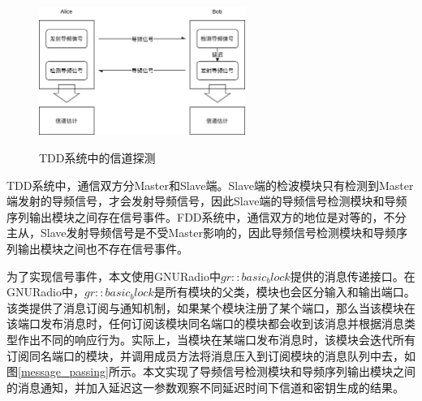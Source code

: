 
\begin{figure}[htbp]
    \centering
    \includegraphics[width=0.6\textwidth]{images/two_tranceiver_structure}
    \caption{TDD系统中的信道探测}{} 
    \label{two_tranceiver_structure}
\end{figure}



TDD系统中，通信双方分Master和Slave端。Slave端的检波模块只有检测到Master端发射的导频信号，才会发射导频信号，因此Slave端的导频信号检测模块和导频序列输出模块之间存在信号事件。FDD系统中，通信双方的地位是对等的，不分主从，Slave发射导频信号是不受Master影响的，因此导频信号检测模块和导频序列输出模块之间也不存在信号事件。

为了实现信号事件，本文使用GNURadio中$gr::basic_block$提供的消息传递接口。在GNURadio中，$gr::basic_block$是所有模块的父类，模块也会区分输入和输出端口。该类提供了消息订阅与通知机制，如果某个模块注册了某个端口，那么当该模块在该端口发布消息时，任何订阅该模块同名端口的模块都会收到该消息并根据消息类型作出不同的响应行为。实际上，当模块在某端口发布消息时，该模块会迭代所有订阅同名端口的模块，并调用成员方法将消息压入到订阅模块的消息队列中去，如图\ref{message_passing}所示。本文实现了导频信号检测模块和导频序列输出模块之间的消息通知，并加入延迟这一参数观察不同延迟时间下信道和密钥生成的结果。

